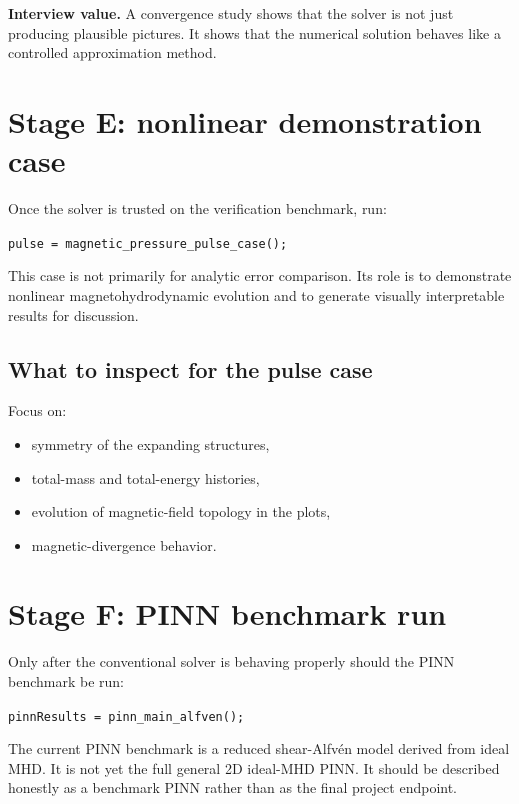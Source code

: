 \documentclass[11pt]{article}
\begin{document}
\begin{implbox}
\textbf{Interview value.} A convergence study shows that the solver is not just producing plausible pictures. It shows that the numerical solution behaves like a controlled approximation method.
\end{implbox}

\section{Stage E: nonlinear demonstration case}
Once the solver is trusted on the verification benchmark, run:
\begin{center}
\texttt{pulse = magnetic\_pressure\_pulse\_case();}
\end{center}
This case is not primarily for analytic error comparison. Its role is to demonstrate nonlinear magnetohydrodynamic evolution and to generate visually interpretable results for discussion.

\subsection{What to inspect for the pulse case}
Focus on:
\begin{itemize}[leftmargin=1.8em]
    \item symmetry of the expanding structures,
    \item total-mass and total-energy histories,
    \item evolution of magnetic-field topology in the plots,
    \item magnetic-divergence behavior.
\end{itemize}

\section{Stage F: PINN benchmark run}
Only after the conventional solver is behaving properly should the PINN benchmark be run:
\begin{center}
\texttt{pinnResults = pinn\_main\_alfven();}
\end{center}
The current PINN benchmark is a reduced shear-Alfv\'en model derived from ideal MHD. It is not yet the full general 2D ideal-MHD PINN. It should be described honestly as a benchmark PINN rather than as the final project endpoint.
\end{document}

